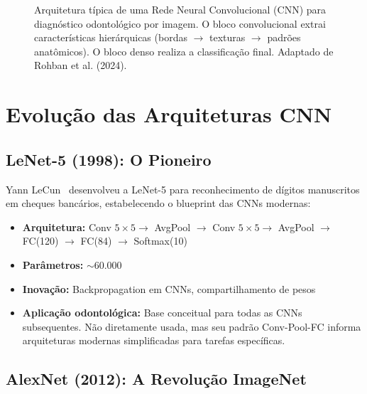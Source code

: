 \begin{figure}[H]
\caption{Arquitetura típica de uma Rede Neural Convolucional (CNN) para diagnóstico odontológico por imagem. O bloco convolucional extrai características hierárquicas (bordas $\rightarrow$ texturas $\rightarrow$ padrões anatômicos). O bloco denso realiza a classificação final. Adaptado de Rohban et al. (2024).}
\label{fig:cnn-architecture}
\end{figure}


\section{Evolução das Arquiteturas CNN}
\label{sec:evolucao-cnn}

\subsection{LeNet-5 (1998): O Pioneiro}

Yann LeCun~\cite{lecun2015deep} desenvolveu a LeNet-5 para reconhecimento de dígitos manuscritos
em cheques bancários, estabelecendo o blueprint das CNNs modernas:

\begin{itemize}
  \item \textbf{Arquitetura:} Conv $5\times5 \to$ AvgPool $\to$ Conv $5\times5
        \to$ AvgPool $\to$ FC(120) $\to$ FC(84) $\to$ Softmax(10)
  \item \textbf{Parâmetros:} $\sim$60.000
  \item \textbf{Inovação:} Backpropagation em CNNs, compartilhamento de pesos
  \item \textbf{Aplicação odontológica:} Base conceitual para todas as CNNs
        subsequentes. Não diretamente usada, mas seu padrão Conv-Pool-FC informa
        arquiteturas modernas simplificadas para tarefas específicas.
\end{itemize}

\subsection{AlexNet (2012): A Revolução ImageNet}

